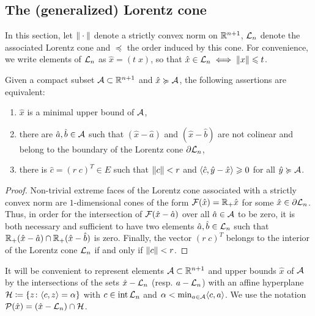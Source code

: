 \documentclass[main]{subfiles}
\begin{document}
%



\subsection{The (generalized) Lorentz cone}
\label{sec:lor_interp_geo}
In this section, 
let $\| \cdot \|$ denote a strictly convex norm on $\mathbb{R}^{n+1}$, $\mathcal{L}_n$ denote the associated Lorentz cone and $\preceq$ the order induced by this cone. For convenience, we write elements of $\mathcal{L}_n$ as $\hat x = (t \; x)$, so that $\hat x \in \mathcal{L}_n \iff \| x \| \leqslant t$.

\begin{corollary}
\label{cor:mub_lor}
Given a compact subset $\mathcal{A} \subset \mathbb{R}^{n+1}$ and $\hat x \succcurlyeq \mathcal{A}$, the following assertions are equivalent:
\begin{enumerate}
\item $\hat x$ is a minimal upper bound of $\mathcal{A}$,
\item there are $\hat a,\hat b \in \mathcal{A}$ such that $(\hat x-\hat a)$ and $ (\hat x-\hat b)$ are not colinear and belong to the boundary of the Lorentz cone $\partial \mathcal{L}_n$,
 \item there is $\hat c = (r \; c)^T \in E$ such that $\| c \| < r$ and $\langle {\hat c} , {\hat y-\hat x} \rangle \geqslant 0$ for all $\hat y \succcurlyeq \mathcal{A}$.
\end{enumerate}
\end{corollary}

\begin{proof}
Non-trivial extreme faces of the Lorentz cone associated with a strictly convex norm are $1$-dimensional cones of the form $\mathcal{F}(\hat x) = \mathbb{R}_+ \hat x$ for some $\hat x \in \partial \mathcal{L}_n$. Thus, in order for the intersection of $\mathcal{F}(\hat x- \hat a)$  over all $\hat a \in \mathcal{A}$ to be zero, it is both necessary and sufficient to have two elements $\hat a,\hat b \in \mathcal{L}_n$ such that $\mathbb{R}_+ (\hat x-\hat a) \cap \mathbb{R}_+ (\hat x-\hat b)$ is zero.
Finally, the vector $(r\;c)^T$ belongs to the interior of the Lorentz cone $\mathcal{L}_n$ if and only if $\| c \| < r$.
\end{proof}

It will be convenient to represent elements $\mathcal{A} \subset \mathbb{R}^{n+1}$ and upper bounds $\hat x$ of $\mathcal{A}$ by  the intersections of the sets $ \hat x - \mathcal{L}_n$ (resp. $ a - \mathcal{L}_n$) with an affine hyperplane $\mathcal{H} \coloneqq \{ z \colon \langle {c} , {z} \rangle = \alpha \}$ with $c \in \operatorname{int} \mathcal{L}_n$ and $\alpha < \min_{a \in \mathcal{A}} \langle {c} , {a} \rangle$. We use the notation $\mathcal{P}(\hat x) = ( \hat x - \mathcal{L}_n)\cap \mathcal{H}$.
\end{document}
